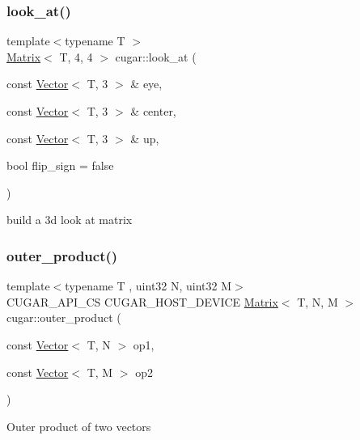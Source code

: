\subsubsection{\texorpdfstring{look\+\_\+at()}{look\_at()}}
{\footnotesize\ttfamily template$<$typename T $>$ \\
\hyperlink{structcugar_1_1_matrix}{Matrix}$<$ T, 4, 4 $>$ cugar\+::look\+\_\+at (\begin{DoxyParamCaption}\item[{const \hyperlink{structcugar_1_1_vector}{Vector}$<$ T, 3 $>$ \&}]{eye,  }\item[{const \hyperlink{structcugar_1_1_vector}{Vector}$<$ T, 3 $>$ \&}]{center,  }\item[{const \hyperlink{structcugar_1_1_vector}{Vector}$<$ T, 3 $>$ \&}]{up,  }\item[{bool}]{flip\+\_\+sign = {\ttfamily false} }\end{DoxyParamCaption})}

build a 3d look at matrix \mbox{\label{group___matrices_module_gaa66a675f08bbed306058f6074b21f57d}} 
\subsubsection{\texorpdfstring{outer\+\_\+product()}{outer\_product()}}
{\footnotesize\ttfamily template$<$typename T , uint32 N, uint32 M$>$ \\
C\+U\+G\+A\+R\+\_\+\+A\+P\+I\+\_\+\+CS C\+U\+G\+A\+R\+\_\+\+H\+O\+S\+T\+\_\+\+D\+E\+V\+I\+CE \hyperlink{structcugar_1_1_matrix}{Matrix}$<$ T, N, M $>$ cugar\+::outer\+\_\+product (\begin{DoxyParamCaption}\item[{const \hyperlink{structcugar_1_1_vector}{Vector}$<$ T, N $>$}]{op1,  }\item[{const \hyperlink{structcugar_1_1_vector}{Vector}$<$ T, M $>$}]{op2 }\end{DoxyParamCaption})\hspace{0.3cm}{\ttfamily [inline]}}

Outer product of two vectors \mbox{\label{group___matrices_module_ga790ca51701b1449de8eab83893034637}} 
